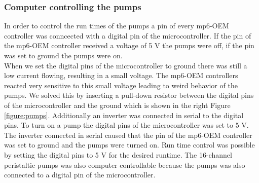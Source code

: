 \subsubsection{Computer controlling the pumps}
In order to control the run times of the pumps a pin of every mp6-OEM controller was conncected with a digital pin of the microcontroller. If the pin of the mp6-OEM controller received a voltage of 5 V the pumps were off, if the pin was set to ground the pumps were on. \\
When we set the digital pins of the microcontroller to ground there was still a low current flowing, resulting in a small voltage. The mp6-OEM controllers reacted very sensitive to this small voltage leading to weird behavior of the pumps. We solved this by inserting a pull-down resistor between the digital pins of the microcontroller and the ground which is shown in the right Figure \ref{figure:pumps}. Additionally an inverter was connected in serial to the digital pins. To turn on a pump the digital pins of the microcontroller was set to 5 V. The inverter connected in serial caused that the pin of the mp6-OEM controller was set to ground and the pumps were turned on. Run time control was possible by setting the digital pins to 5 V for the desired runtime.
The 16-channel peristaltic pumps was also computer controllable because the pumps was also connected to a digital pin of the microcontroller.
\label{section:pumps}

